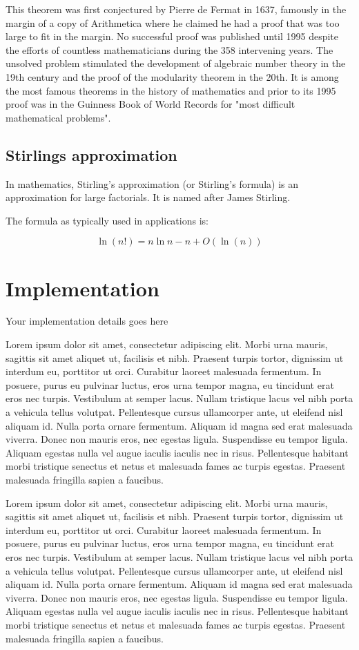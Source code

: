 \documentclass{fisatproject}
\begin{document}
This theorem was first conjectured by Pierre de Fermat in 1637, famously in the margin of a copy of Arithmetica where he claimed he had a proof that was too large to fit in the margin. No successful proof was published until 1995 despite the efforts of countless mathematicians during the 358 intervening years. The unsolved problem stimulated the development of algebraic number theory in the 19th century and the proof of the modularity theorem in the 20th. It is among the most famous theorems in the history of mathematics and prior to its 1995 proof was in the Guinness Book of World Records for "most difficult mathematical problems".

\subsection{Stirlings approximation}
In mathematics, Stirling's approximation (or Stirling's formula) is an approximation for large factorials. It is named after James Stirling.

The formula as typically used in applications is:

$$
\ln (n!) = n \ln n - n  + O(\ln(n))
$$

\section{Implementation}

Your implementation details goes here

Lorem ipsum dolor sit amet, consectetur adipiscing elit. Morbi urna mauris, sagittis sit amet aliquet ut, facilisis et nibh. Praesent turpis tortor, dignissim ut interdum eu, porttitor ut orci. Curabitur laoreet malesuada fermentum. In posuere, purus eu pulvinar luctus, eros urna tempor magna, eu tincidunt erat eros nec turpis. Vestibulum at semper lacus. Nullam tristique lacus vel nibh porta a vehicula tellus volutpat. Pellentesque cursus ullamcorper ante, ut eleifend nisl aliquam id. Nulla porta ornare fermentum. Aliquam id magna sed erat malesuada viverra. Donec non mauris eros, nec egestas ligula. Suspendisse eu tempor ligula. Aliquam egestas nulla vel augue iaculis iaculis nec in risus. Pellentesque habitant morbi tristique senectus et netus et malesuada fames ac turpis egestas. Praesent malesuada fringilla sapien a faucibus.

Lorem ipsum dolor sit amet, consectetur adipiscing elit. Morbi urna mauris, sagittis sit amet aliquet ut, facilisis et nibh. Praesent turpis tortor, dignissim ut interdum eu, porttitor ut orci. Curabitur laoreet malesuada fermentum. In posuere, purus eu pulvinar luctus, eros urna tempor magna, eu tincidunt erat eros nec turpis. Vestibulum at semper lacus. Nullam tristique lacus vel nibh porta a vehicula tellus volutpat. Pellentesque cursus ullamcorper ante, ut eleifend nisl aliquam id. Nulla porta ornare fermentum. Aliquam id magna sed erat malesuada viverra. Donec non mauris eros, nec egestas ligula. Suspendisse eu tempor ligula. Aliquam egestas nulla vel augue iaculis iaculis nec in risus. Pellentesque habitant morbi tristique senectus et netus et malesuada fames ac turpis egestas. Praesent malesuada fringilla sapien a faucibus.
\end{document}
